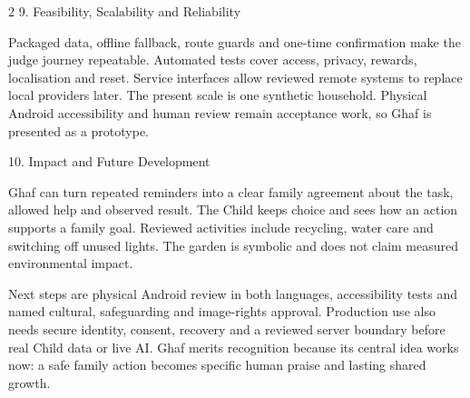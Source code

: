 \documentclass[11pt,a4paper]{article}
\newcommand{\briefsection}[2]{%
  \vspace{1.5pt}%
  {\displayfont\fontsize{10.8}{12.4}\selectfont\color{Ghaf}#1. #2}\par
  \vspace{0.3pt}%
}
\begin{document}
\begin{multicols}{2}
\briefsection{9}{Feasibility, Scalability and Reliability}
Packaged data, offline fallback, route guards and one-time confirmation make the judge journey repeatable. Automated tests cover access, privacy, rewards, localisation and reset. Service interfaces allow reviewed remote systems to replace local providers later. The present scale is one synthetic household. Physical Android accessibility and human review remain acceptance work, so Ghaf is presented as a prototype.

\briefsection{10}{Impact and Future Development}
Ghaf can turn repeated reminders into a clear family agreement about the task, allowed help and observed result. The Child keeps choice and sees how an action supports a family goal. Reviewed activities include recycling, water care and switching off unused lights. The garden is symbolic and does not claim measured environmental impact.

Next steps are physical Android review in both languages, accessibility tests and named cultural, safeguarding and image-rights approval. Production use also needs secure identity, consent, recovery and a reviewed server boundary before real Child data or live AI. Ghaf merits recognition because its central idea works now: a safe family action becomes specific human praise and lasting shared growth.

\end{multicols}
\end{document}
